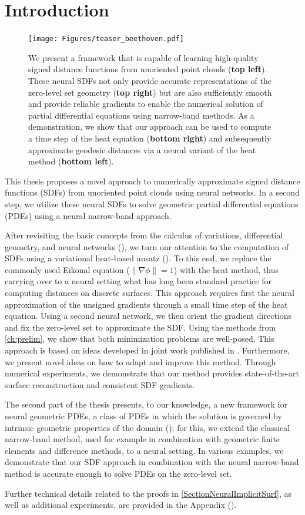 \documentclass[12pt,openany]{book}
\theoremstyle{plainnormal}
\theoremstyle{remark}
\begin{document}
\section{Introduction}
\begin{figure}
    \centering
    \texttt{[image: Figures/teaser\_beethoven.pdf]}
    \caption{We present a framework that is capable of learning high-quality signed distance functions from unoriented point clouds (\textbf{top left}). These neural SDFs not only provide accurate representations of the zero-level set geometry (\textbf{top right}) but are also sufficiently smooth and provide reliable gradients to enable the numerical solution of partial differential equations using narrow-band methods. As a demonstration, we show that our approach can be used to compute a time step of the heat equation (\textbf{bottom right}) and subsequently approximate geodesic distances via a neural variant of the heat method (\textbf{bottom left}). }
    \label{teaser}
\end{figure}
This thesis proposes a novel approach to numerically approximate signed distance functions (SDFs) from unoriented point clouds using neural networks. In a second step, we utilize these neural SDFs to solve geometric partial differential equations (PDEs) using a neural narrow-band approach.\par
After revisiting the basic concepts from the calculus of variations, differential geometry, and neural networks (), we turn our attention to the computation of SDFs using a variational heat-based ansatz (). To this end, we replace the commonly used Eikonal equation ($\|\nabla \phi\| = 1$) with the heat method, thus carrying over to a neural setting what has long been standard practice for computing distances on discrete surfaces. This approach requires first the neural approximation of the unsigned gradients through a small time step of the heat equation. Using a second neural network, we then orient the gradient directions and fix the zero-level set to approximate the SDF. Using the methods from \cref{ch:prelim}, we show that both minimization problems are well-posed. This approach is based on ideas developed in joint work published in \cite{weidemaier2025sdfsunorientedpointclouds}. Furthermore, we present novel ideas on how to adapt and improve this method. Through numerical experiments, we demonstrate that our method provides state-of-the-art surface reconstruction and consistent SDF gradients.\par
The second part of the thesis presents, to our knowledge, a new framework for neural geometric PDEs, a class of PDEs in which the solution is governed by intrinsic geometric properties of the domain (); for this, we extend the classical narrow-band method, used for example in combination with geometric finite elements and difference methods, to a neural setting. In various examples, we demonstrate that our SDF approach in combination with the neural narrow-band method is accurate enough to solve PDEs on the zero-level set.\par
Further technical details related to the proofs in \cref{SectionNeuralImplicitSurf}, as well as additional experiments, are provided in the Appendix ().
\newpage
{}
\end{document}
